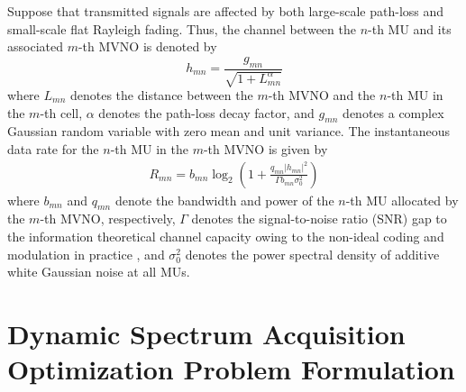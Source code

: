 \documentclass[journal]{IEEEtran}
\begin{document}
Suppose that transmitted signals are affected by both large-scale path-loss and small-scale flat Rayleigh fading. Thus, the channel between the $n$-th MU and its associated $m$-th MVNO is denoted by
\begin{equation}
h_{mn}=\frac{g_{mn}}{\sqrt{1+L_{mn}^\alpha}}
\end{equation}
where $L_{mn}$ denotes the distance between the $m$-th MVNO and the $n$-th MU in the $m$-th cell, $\alpha$ denotes the path-loss decay factor, and $g_{mn}$ denotes a complex Gaussian random variable with zero mean and unit variance. The instantaneous data rate for the $n$-th MU in the $m$-th MVNO is given by
\begin{align}
R_{mn} = b_{mn}\log_2\left(1+\frac{q_{mn}\left|h_{mn}\right|^2 }{\Gamma b_{mn}\sigma_0^2}\right)
\end{align}
where $b_{mn}$ and $q_{mn}$ denote the bandwidth and power of the $n$-th MU allocated by the $m$-th MVNO, respectively, $\Gamma$ denotes the signal-to-noise ratio (SNR) gap to the information theoretical channel capacity owing to the non-ideal coding and modulation in practice \cite{JGDForney}, and $\sigma_0^2$ denotes the power spectral density of additive white Gaussian noise at all MUs.


\section{Dynamic Spectrum Acquisition Optimization Problem Formulation}
\end{document}
